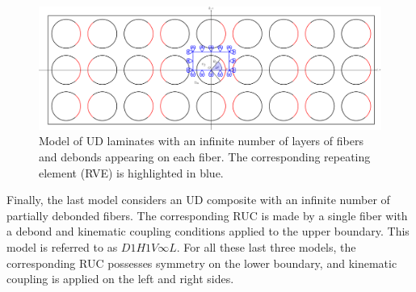 \documentclass[review]{elsarticle}
\begin{document}
\begin{figure}[!h]
\centering
\includegraphics[width=\textwidth]{thickPlyAllDebonds.pdf}
\caption{Model of UD laminates with an infinite number of  layers of fibers and debonds appearing on each fiber. The corresponding repeating element (RVE) is highlighted in blue.}\label{fig:thickplyalldebonds}
\end{figure}

Finally, the last model considers an UD composite with an infinite number of partially debonded fibers. The corresponding RUC is made by a single fiber with a debond and kinematic coupling conditions applied to the upper boundary. This model is referred to as $D1H1V\infty L$. For all these last three models, the corresponding RUC possesses symmetry on the lower boundary, and kinematic coupling is applied on the left and right sides.
\end{document}

